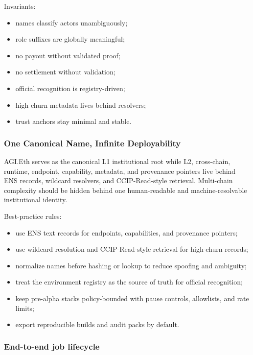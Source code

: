 \documentclass[
  11pt,
]{article}
\providecommand{\tightlist}{%
  \setlength{\itemsep}{0pt}\setlength{\parskip}{0pt}}
\begin{document}
Invariants:

\begin{itemize}
\tightlist
\item
  names classify actors unambiguously;
\item
  role suffixes are globally meaningful;
\item
  no payout without validated proof;
\item
  no settlement without validation;
\item
  official recognition is registry-driven;
\item
  high-churn metadata lives behind resolvers;
\item
  trust anchors stay minimal and stable.
\end{itemize}

\subsubsection{One Canonical Name, Infinite
Deployability}\label{one-canonical-name-infinite-deployability}

AGI.Eth serves as the canonical L1 institutional root while L2,
cross-chain, runtime, endpoint, capability, metadata, and provenance
pointers live behind ENS records, wildcard resolvers, and
CCIP-Read-style retrieval. Multi-chain complexity should be hidden
behind one human-readable and machine-resolvable institutional identity.

Best-practice rules:

\begin{itemize}
\tightlist
\item
  use ENS text records for endpoints, capabilities, and provenance
  pointers;
\item
  use wildcard resolution and CCIP-Read-style retrieval for high-churn
  records;
\item
  normalize names before hashing or lookup to reduce spoofing and
  ambiguity;
\item
  treat the environment registry as the source of truth for official
  recognition;
\item
  keep pre-alpha stacks policy-bounded with pause controls, allowlists,
  and rate limits;
\item
  export reproducible builds and audit packs by default.
\end{itemize}

\subsubsection{End-to-end job lifecycle}\label{end-to-end-job-lifecycle}
\end{document}
